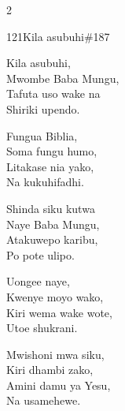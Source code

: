 \documentclass{article}
\begin{document}
\begin{multicols}{2}
\begin{hymn}{121}{Kila asubuhi}{\#187}
\begin{stanza}
Kila asubuhi,\\
Mwombe Baba Mungu,\\
Tafuta uso wake na\\
Shiriki upendo.
\end{stanza}
\begin{stanza}
Fungua Biblia,\\
Soma fungu humo,\\
Litakase nia yako,\\
Na kukuhifadhi.
\end{stanza}
\begin{stanza}
Shinda siku kutwa\\
Naye Baba Mungu,\\
Atakuwepo karibu,\\
Po pote ulipo.
\end{stanza}
\begin{stanza}
Uongee naye,\\
Kwenye moyo wako,\\
Kiri wema wake wote,\\
Utoe shukrani.
\end{stanza}
\begin{stanza}
Mwishoni mwa siku,\\
Kiri dhambi zako,\\
Amini damu ya Yesu,\\
Na usamehewe.
\end{stanza}
\end{hymn}


\end{multicols}
\end{document}
